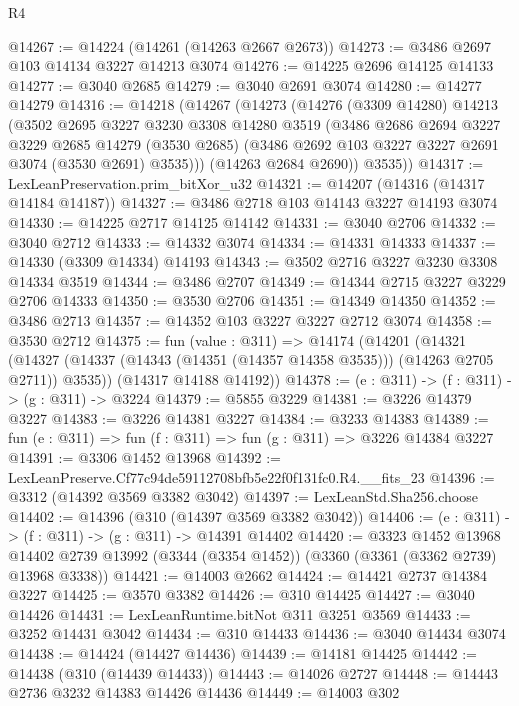 \begin{lexlean}{R4}
\begin{coremodule}
@14267 := @14224 (@14261 (@14263 @2667 @2673))
@14273 := @3486 @2697 @103 @14134 @3227 @14213 @3074
@14276 := @14225 @2696 @14125 @14133
@14277 := @3040 @2685
@14279 := @3040 @2691 @3074
@14280 := @14277 @14279
@14316 := @14218
    (@14267
      (@14273
        (@14276
          (@3309 @14280)
          @14213
          (@3502
            @2695
            @3227
            @3230
            @3308
            @14280
            @3519
            (@3486
              @2686
              @2694
              @3227
              @3229
              @2685
              @14279
              (@3530 @2685)
              (@3486 @2692 @103 @3227 @3227 @2691 @3074 (@3530 @2691) @3535)))
          (@14263 @2684 @2690))
        @3535))
@14317 := LexLeanPreservation.prim_bitXor_u32
@14321 := @14207 (@14316 (@14317 @14184 @14187))
@14327 := @3486 @2718 @103 @14143 @3227 @14193 @3074
@14330 := @14225 @2717 @14125 @14142
@14331 := @3040 @2706
@14332 := @3040 @2712
@14333 := @14332 @3074
@14334 := @14331 @14333
@14337 := @14330 (@3309 @14334) @14193
@14343 := @3502 @2716 @3227 @3230 @3308 @14334 @3519
@14344 := @3486 @2707
@14349 := @14344 @2715 @3227 @3229 @2706 @14333
@14350 := @3530 @2706
@14351 := @14349 @14350
@14352 := @3486 @2713
@14357 := @14352 @103 @3227 @3227 @2712 @3074
@14358 := @3530 @2712
@14375 := fun (value : @311) =>
  @14174
    (@14201
      (@14321 (@14327 (@14337 (@14343 (@14351 (@14357 @14358 @3535))) (@14263 @2705 @2711)) @3535))
      (@14317 @14188 @14192))
@14378 := (e : @311) -> (f : @311) -> (g : @311) -> @3224
@14379 := @5855 @3229
@14381 := @3226 @14379 @3227
@14383 := @3226 @14381 @3227
@14384 := @3233 @14383
@14389 := fun (e : @311) => fun (f : @311) => fun (g : @311) => @3226 @14384 @3227
@14391 := @3306 @1452 @13968
@14392 := LexLeanPreserve.Cf77c94de59112708bfb5e22f0f131fc0.R4.__fits_23
@14396 := @3312 (@14392 @3569 @3382 @3042)
@14397 := LexLeanStd.Sha256.choose
@14402 := @14396 (@310 (@14397 @3569 @3382 @3042))
@14406 := (e : @311) -> (f : @311) -> (g : @311) -> @14391 @14402
@14420 := @3323
    @1452
    @13968
    @14402
    @2739
    @13992
    (@3344 (@3354 @1452))
    (@3360 (@3361 (@3362 @2739) @13968 @3338))
@14421 := @14003 @2662
@14424 := @14421 @2737 @14384 @3227
@14425 := @3570 @3382
@14426 := @310 @14425
@14427 := @3040 @14426
@14431 := LexLeanRuntime.bitNot @311 @3251 @3569
@14433 := @3252 @14431 @3042
@14434 := @310 @14433
@14436 := @3040 @14434 @3074
@14438 := @14424 (@14427 @14436)
@14439 := @14181 @14425
@14442 := @14438 (@310 (@14439 @14433))
@14443 := @14026 @2727
@14448 := @14443 @2736 @3232 @14383 @14426 @14436
@14449 := @14003 @302

\end{coremodule}
\end{lexlean}
